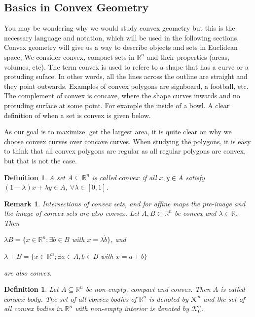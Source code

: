 \documentclass[a4paper]{book}
\newtheorem{remark}[theorem]{Remark}%
\newtheorem{definition}[theorem]{Definition}%
\numberwithin{theorem}{section}%
\begin{document}
\subsection{Basics in Convex Geometry}
You may be wondering why we would study convex geometry but this is the necessary language and notation, which will be used in the following sections. Convex geometry will give us a way to describe objects and sets in Euclidean space; We consider convex, compact sets in $\mathbb{R}^n$ and their properties (areas, volumes, etc). The term convex is used to refere to a shape that has a curve or a protuding suface. In other words, all the lines across the outline are straight and they point outwards. Examples of convex polygons are signboard, a football, etc. The complement of convex is concave, where the shape curves inwards and no protuding surface at some point. For example the inside of a bowl. A clear definition of when a set is convex is given below. 

As our goal is to maximize, get the largest area, it is quite clear on why we choose convex curves over concave curves. When studying the polygons, it is easy to think that all convex polygons are regular as all regular polygons are convex, but that is not the case.
\newline

\begin{definition}
	A set $A\subseteq\mathbb{R}^n$ is called $convex$ if all $x,y\in A$ satisfy $(1-\lambda)x+\lambda y\in A$, $\forall\lambda\in[0,1]$.
\end{definition}

\begin{remark}
	Intersections of convex sets, and for affine maps the pre-image and the image of convex sets are also convex. Let $A, B \subset\mathbb{R}^n$ be convex and $\lambda\in\mathbb{R}$. Then
	\begin{center}
		$\lambda B=\{x\in\mathbb{R}^n;\exists b\in B$ with $x=\lambda\dot b\}$, and
	
		$\lambda+B=\{x\in\mathbb{R}^n;\exists a\in A, b\in B$ with $x=a+b\}$
	\end{center}
	are also convex.
\end{remark}

\begin{definition}
	Let $A\subseteq\mathbb{R}^n$ be non-empty, compact and convex. Then $A$ is called $convex$ $body$. The set of all convex bodies of $\mathbb{R}^n$ is denoted by $\mathscr{K}^n$ and the set of all convex bodies in $\mathbb{R}^n$ with non-empty interior is denoted by $\mathscr{K}_{0}^{n}$.
\end{definition}
\end{document}
